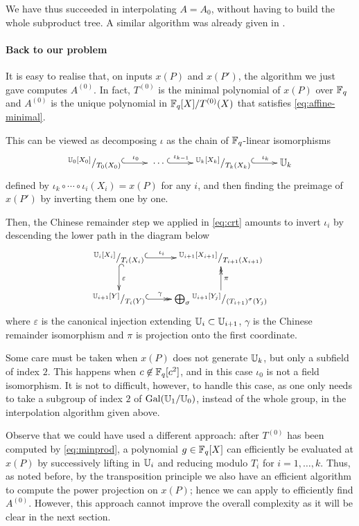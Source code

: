 We have thus succeeded in interpolating $A=A_0$, without having to
build the whole subproduct tree. A similar algorithm was already given
in \cite{EnMo03}.


\paragraph{Back to our problem}
It is easy to realise that, on inputs $x(P)$ and $x(P')$, the
algorithm we just gave computes $A^{(0)}$. In fact, $T^{(0)}$ is
the minimal polynomial of $x(P)$ over $\mathbb{F}_q$ and $A^{(0)}$ is the
unique polynomial in $\mathbb{F}_q[X]/T^{(0)}(X)$ that satisfies
\eqref{eq:affine-minimal}.

This can be viewed as decomposing $\iota$ as the chain of
$\mathbb{F}_q$-linear isomorphisms
\begin{equation}
  \xymatrix{
    ^{\U_0[X_0]}/_{T_0(X_0)} \ar@{^{(}->}[r]^-{\iota_0} &
    \;\cdots\; \ar@{^{(}->}[r]^-{\iota_{k-1}} &
    ^{\U_k[X_k]}/_{T_k(X_k)} \ar@{^{(}->}[r]^-{\iota_k} &
    \U_k
  }
\end{equation}
defined by $\iota_k\circ\cdots\circ\iota_i(X_i) = x(P)$ for any $i$,
and then finding the preimage of $x(P')$ by inverting them one by
one.

Then, the Chinese remainder step we applied in \eqref{eq:crt} amounts
to invert $\iota_i$ by descending the lower path in the diagram below
\begin{equation}
  \xymatrix{
    ^{\U_i[X_i]}/_{T_i(X_i)} \ar@{^{(}->}[r]^-{\iota_i} \ar@{^{(}->}[d]^{\varepsilon} &
    ^{\U_{i+1}[X_{i+1}]}/_{T_{i+1}(X_{i+1})} \\
    ^{\U_{i+1}[Y]}/_{T_i(Y)} \ar@{^{(}->>}[r]^-{\gamma} &
    \bigoplus_\sigma {}^{\U_{i+1}[Y_{j}]}/_{\left(T_{i+1}\right)^\sigma(Y_{j})} \ar@{->>}[u]_{\pi}
  }
\end{equation}
where $\varepsilon$ is the canonical injection extending
$\mathbb{U}_i\subset\mathbb{U}_{i+1}$, $\gamma$ is the Chinese remainder isomorphism
and $\pi$ is projection onto the first coordinate.

Some care must be taken when $x(P)$ does not generate $\mathbb{U}_k$, but only
a subfield of index $2$. This happens when $c\not\in\mathbb{F}_q[c^2]$, and in
this case $\iota_0$ is not a field isomorphism. It is not to
difficult, however, to handle this case, as one only needs to take a
subgroup of index $2$ of $\operatorname{Gal}(\mathbb{U}_1/\mathbb{U}_0)$, instead of the whole
group, in the interpolation algorithm given above.

Observe that we could have used a different approach: after $T^{(0)}$
has been computed by \eqref{eq:minprod}, a polynomial $g\in\mathbb{F}_q[X]$
can efficiently be evaluated at $x(P)$ by successively lifting in
$\mathbb{U}_i$ and reducing modulo $T_i$ for $i=1,\ldots,k$. Thus, as noted
before, by the transposition principle we also have an efficient
algorithm to compute the power projection on $x(P)$; hence we can
apply \cite{PS06} to efficiently find $A^{(0)}$. However, this
approach cannot improve the overall complexity as it will be clear
in the next section.


